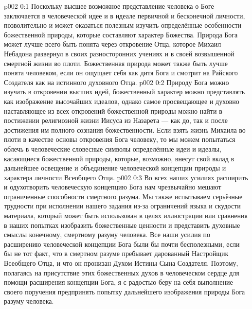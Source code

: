 \author{Божественный Советник}
\vs p002 0:1 Поскольку высшее возможное представление человека о Боге заключается в человеческой идее и в идеале первичной и бесконечной личности, позволительно и может оказаться полезным изучить определённые особенности божественной природы, которые составляют характер Божества. Природа Бога может лучше всего быть понята через откровение Отца, которое Михаил Небадона развернул в своих разносторонних учениях и в своей возвышенной смертной жизни во плоти. Божественная природа может также быть лучше понята человеком, если он ощущает себя как дитя Бога и смотрит на Райского Создателя как на истинного духовного Отца.
\vs p002 0:2 Природу Бога можно изучать в откровении высших идей, божественный характер можно представлять как изображение высочайших идеалов, однако самое просвещающее и духовно наставляющее из всех откровений божественной природы можно найти в постижении религиозной жизни Иисуса из Назарета --- как до, так и после достижения им полного сознания божественности. Если взять жизнь Михаила во плоти в качестве основы откровения Бога человеку, то мы можем попытаться облечь в человеческие словесные символы определённые идеи и идеалы, касающиеся божественной природы, которые, возможно, внесут свой вклад в дальнейшее освещение и объединение человеческой концепции природы и характера личности Всеобщего Отца.
\vs p002 0:3 Во всех наших усилиях расширить и одухотворить человеческую концепцию Бога нам чрезвычайно мешают ограниченные способности смертного разума. Мы также испытываем серьёзные трудности при исполнении нашего задания из\hyp{}за ограничений языка и скудости материала, который может быть использован в целях иллюстрации или сравнения в наших попытках изобразить божественные ценности и представить духовные смыслы конечному, смертному разуму человека. Все наши усилия по расширению человеческой концепции Бога были бы почти бесполезными, если бы не тот факт, что в смертном разуме пребывает дарованный Настройщик Всеобщего Отца, и что он пронизан Духом Истины Сына Создателя. Поэтому, полагаясь на присутствие этих божественных духов в человеческом сердце для помощи расширения концепции Бога, я с радостью беру на себя выполнение своего поручения предпринять попытку дальнейшего изображения природы Бога разуму человека.
